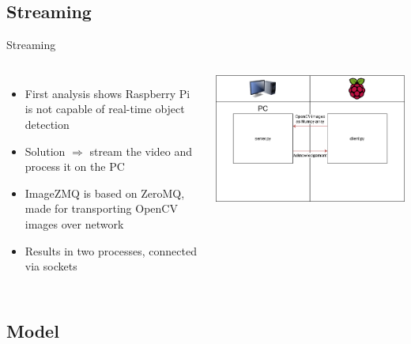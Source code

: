 \documentclass{beamer}
\begin{document}
\subsection{Streaming}

\begin{frame}{Streaming}
\begin{columns}
\begin{itemize}
\item First analysis shows Raspberry Pi is not capable of real-time object detection
\item Solution $\Rightarrow$ stream the video and process it on the PC
\item ImageZMQ is based on ZeroMQ, made for transporting OpenCV images over network
\item Results in two processes, connected via sockets
\end{itemize}
\includegraphics[scale=0.26]{sources/diagram.png}
\end{columns}
\end{frame}

\subsection{Model}
\end{document}
